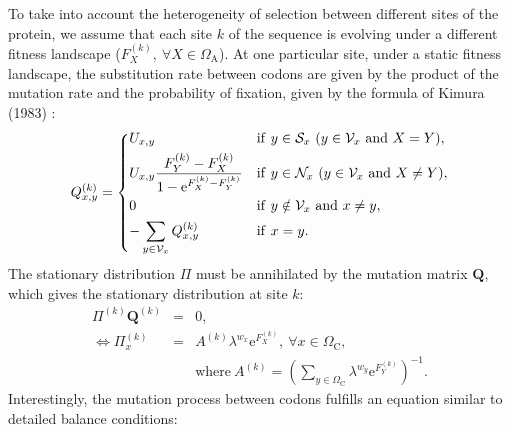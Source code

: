 \documentclass{article}
\newcommand{\e}{\mathrm{e}}
\newcommand{\SetCodon}{\Omega_{\mathrm{C}}}
\newcommand{\SetAa}{\Omega_{\mathrm{A}}}
\newcommand{\Neighbor}{\mathcal{V}}
\newcommand{\NonSyn}{\mathcal{N}}
\newcommand{\Syn}{\mathcal{S}}
\newcommand{\Nx}{\Neighbor_x}
\newcommand{\NxNonSyn}{\NonSyn_x}
\newcommand{\NxSyn}{\Syn_x}
\begin{document}
    To take into account the heterogeneity of selection between different sites of the protein, we assume that each site $k$ of the sequence is evolving under a different fitness landscape ($F_X^{(k)}, \ \forall X \in \SetAa $).
    At one particular site, under a static fitness landscape, the substitution rate between codons are given by the product of the mutation rate and the probability of fixation, given by the formula of Kimura (1983) \cite{kimura_neutral_1983}:
    \begin{equation}
        \label{codonSubRates}
        Q_{x, y}^{(k)} =
        \begin{dcases}
            U_{x, y}
            & \mathrm{if} \ y \in \NxSyn \ (y \in \Nx \ \mathrm{and} \ X = Y),  \\
            U_{x, y} \dfrac{F_Y^{(k)} - F_X^{(k)}}{1 - \e^{F_X^{(k)} - F_Y^{(k)}}}
            & \mathrm{if} \ y \in \NxNonSyn \ (y \in \Nx \ \mathrm{and} \ X \neq Y),  \\
            0
            & \mathrm{if} \  y \notin \Nx \ \mathrm{ and } \ x \neq y, \\
            - \sum_{y \in \Nx }  Q_{x, y}^{(k)}
            & \mathrm{if} \ x = y.  \\
        \end{dcases}
    \end{equation}
    The stationary distribution $\Pi$ must be annihilated by the mutation matrix $\bm{Q}$, which gives the stationary distribution at site $k$:
    \begin{eqnarray}
        \Pi^{(k)} \bm{Q}^{(k)}
        & = & 0 ,\\
        \iff \Pi_x^{(k)}
        & = & A^{(k)} \lambda^{w_x} \e^{F_X^{(k)}} ,\ \forall x \in \SetCodon,\\
        &  & \mathrm{ where } \ A^{(k)} = \left( \sum_{y \in \SetCodon} \lambda^{w_y} \e^{F_Y^{(k)}} \right)^{-1}.
        \label{codonStationarity}
    \end{eqnarray}
    Interestingly, the mutation process between codons fulfills an equation similar to detailed balance conditions:
\end{document}
